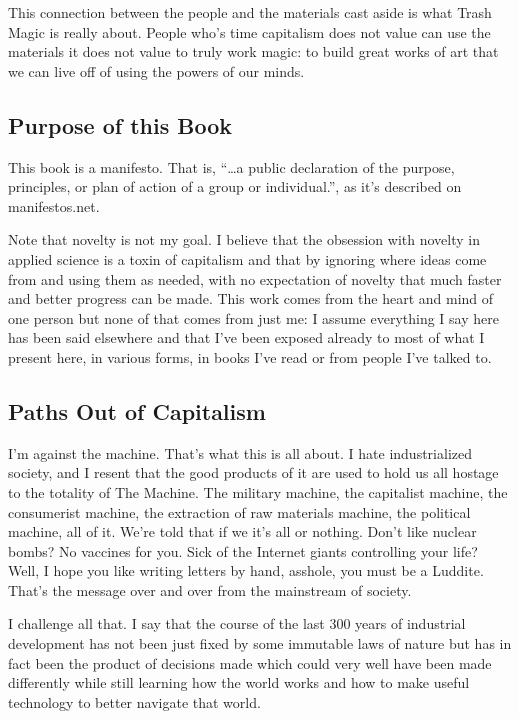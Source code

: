 This connection between the people and the materials cast aside is what
Trash Magic is really about. People who's time capitalism does not value
can use the materials it does not value to truly work magic: to build
great works of art that we can live off of using the powers of our
minds.

\subsection{Purpose of this Book}\label{purpose-of-this-book}

This book is a manifesto. That is, ``\ldots{}a public declaration of the
purpose, principles, or plan of action of a group or individual.'', as
it's described on manifestos.net.

Note that novelty is not my goal. I believe that the obsession with
novelty in applied science is a toxin of capitalism and that by ignoring
where ideas come from and using them as needed, with no expectation of
novelty that much faster and better progress can be made. This work
comes from the heart and mind of one person but none of that comes from
just me: I assume everything I say here has been said elsewhere and that
I've been exposed already to most of what I present here, in various
forms, in books I've read or from people I've talked to.

\subsection{Paths Out of Capitalism}\label{paths-out-of-capitalism}

I'm against the machine. That's what this is all about. I hate
industrialized society, and I resent that the good products of it are
used to hold us all hostage to the totality of The Machine. The military
machine, the capitalist machine, the consumerist machine, the extraction
of raw materials machine, the political machine, all of it. We're told
that if we it's all or nothing. Don't like nuclear bombs? No vaccines
for you. Sick of the Internet giants controlling your life? Well, I hope
you like writing letters by hand, asshole, you must be a Luddite. That's
the message over and over from the mainstream of society.

I challenge all that. I say that the course of the last 300 years of
industrial development has not been just fixed by some immutable laws of
nature but has in fact been the product of decisions made which could
very well have been made differently while still learning how the world
works and how to make useful technology to better navigate that world.
